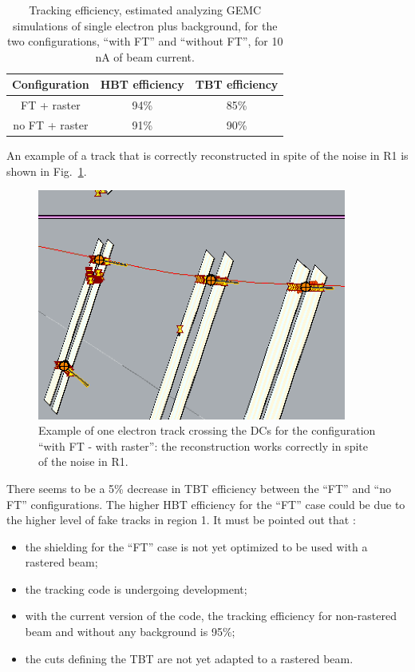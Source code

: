 \begin{table}[htbp]
   \centering
   \begin{tabular}{|c||c||c|} 
	\hline
      Configuration    & HBT efficiency & TBT efficiency \\
	\hline
      FT + raster & 94\% & 85\%\\
      no FT + raster & 91\% & 90\%\\
	\hline
   \end{tabular}
   \caption{Tracking efficiency, estimated analyzing GEMC simulations of single electron plus background, for the two configurations, ``with FT'' and ``without FT'', for 10 nA of beam current.}
   \label{track_eff_table}
\end{table}
An example of a track that is correctly reconstructed in spite of the noise in R1 is shown in Fig.~\ref{tracking_eff}. 
\begin{figure}[htbp] 
   \centering
   \includegraphics[width=4in]{RecoTrack.png} 
   \caption{Example of one electron track crossing the DCs for the configuration ``with FT - with raster'': the reconstruction works correctly in spite of the noise in R1.}
   \label{tracking_eff}
\end{figure}
There seems to be a 5\% decrease in TBT efficiency between the ``FT'' and ``no FT'' configurations. The higher HBT efficiency for the ``FT'' case could be due to the higher level of fake tracks in region 1. 
It must be pointed out that \cite{veronique_private}:
\begin{itemize}
\item{the shielding for the ``FT'' case is not yet optimized to be used with a rastered beam;}
\item{the tracking code is undergoing development;}
\item{with the current version of the code, the tracking efficiency for non-rastered beam and without any background is 95\%;}
\item{the cuts defining the TBT are not yet adapted to a rastered beam.}
\end{itemize}
